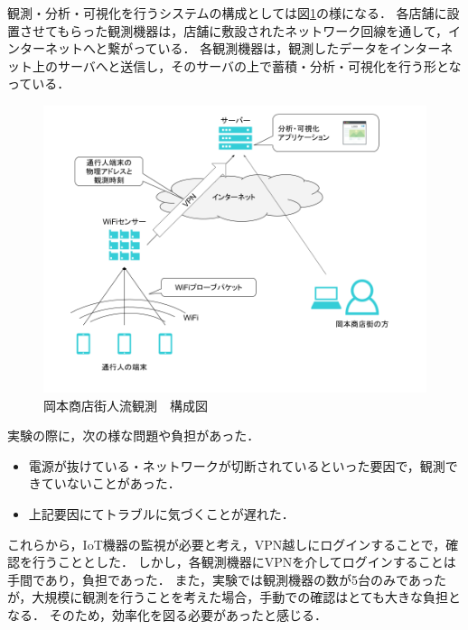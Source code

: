 観測・分析・可視化を行うシステムの構成としては図\ref{fig:okamoto_diag1}の様になる．
各店舗に設置させてもらった観測機器は，店舗に敷設されたネットワーク回線を通して，インターネットへと繋がっている．
各観測機器は，観測したデータをインターネット上のサーバへと送信し，そのサーバの上で蓄積・分析・可視化を行う形となっている．
\begin{figure}[htb]
\includegraphics[width=16cm]{images/okamoto_diag1.png}
\caption{岡本商店街人流観測　構成図}
\label{fig:okamoto_diag1}
\end{figure}
\medskip

実験の際に，次の様な問題や負担があった．
\begin{itemize}
\item 電源が抜けている・ネットワークが切断されているといった要因で，観測できていないことがあった．
\item 上記要因にてトラブルに気づくことが遅れた．
\end{itemize}
これらから，IoT機器の監視が必要と考え，VPN越しにログインすることで，確認を行うこととした．
しかし，各観測機器にVPNを介してログインすることは手間であり，負担であった．
また，実験では観測機器の数が5台のみであったが，大規模に観測を行うことを考えた場合，手動での確認はとても大きな負担となる．
そのため，効率化を図る必要があったと感じる．

